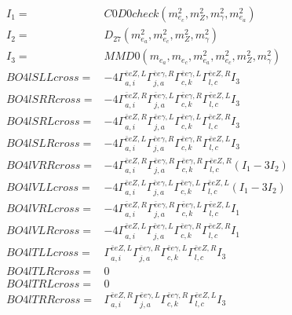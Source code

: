 \documentclass[A4,landscape]{article}
\begin{document}
\begin{align} 
I_1 = & C0D0check(m^2_{e_{{c}}}, m^2_{Z}, m^2_{\gamma}, m^2_{e_{{a}}}) \\ 
I_2 = & D_{27}(m^2_{e_{{a}}}, m^2_{e_{{c}}}, m^2_{Z}, m^2_{\gamma}) \\ 
I_3 = & MMD0(m_{e_{{a}}}, m_{e_{{c}}}, m^2_{e_{{a}}}, m^2_{e_{{c}}}, m^2_{Z}, m^2_{\gamma}) \\ 
  BO4lSLLcross= & -4  \Gamma^{\bar{e}e Z ,L}_{a, i} \Gamma^{\bar{e}e \gamma ,R}_{j, a} \Gamma^{\bar{e}e \gamma ,L}_{c, k} \Gamma^{\bar{e}e Z ,R}_{l, c} I_3 \\ 
  BO4lSRRcross= & -4  \Gamma^{\bar{e}e Z ,R}_{a, i} \Gamma^{\bar{e}e \gamma ,L}_{j, a} \Gamma^{\bar{e}e \gamma ,R}_{c, k} \Gamma^{\bar{e}e Z ,L}_{l, c} I_3 \\ 
  BO4lSRLcross= & -4  \Gamma^{\bar{e}e Z ,R}_{a, i} \Gamma^{\bar{e}e \gamma ,L}_{j, a} \Gamma^{\bar{e}e \gamma ,L}_{c, k} \Gamma^{\bar{e}e Z ,R}_{l, c} I_3 \\ 
  BO4lSLRcross= & -4  \Gamma^{\bar{e}e Z ,L}_{a, i} \Gamma^{\bar{e}e \gamma ,R}_{j, a} \Gamma^{\bar{e}e \gamma ,R}_{c, k} \Gamma^{\bar{e}e Z ,L}_{l, c} I_3 \\ 
  BO4lVRRcross= & -4  \Gamma^{\bar{e}e Z ,R}_{a, i} \Gamma^{\bar{e}e \gamma ,R}_{j, a} \Gamma^{\bar{e}e \gamma ,R}_{c, k} \Gamma^{\bar{e}e Z ,R}_{l, c} (I_1 - 3 I_2) \\ 
  BO4lVLLcross= & -4  \Gamma^{\bar{e}e Z ,L}_{a, i} \Gamma^{\bar{e}e \gamma ,L}_{j, a} \Gamma^{\bar{e}e \gamma ,L}_{c, k} \Gamma^{\bar{e}e Z ,L}_{l, c} (I_1 - 3 I_2) \\ 
  BO4lVRLcross= & -4  \Gamma^{\bar{e}e Z ,R}_{a, i} \Gamma^{\bar{e}e \gamma ,R}_{j, a} \Gamma^{\bar{e}e \gamma ,L}_{c, k} \Gamma^{\bar{e}e Z ,L}_{l, c} I_1 \\ 
  BO4lVLRcross= & -4  \Gamma^{\bar{e}e Z ,L}_{a, i} \Gamma^{\bar{e}e \gamma ,L}_{j, a} \Gamma^{\bar{e}e \gamma ,R}_{c, k} \Gamma^{\bar{e}e Z ,R}_{l, c} I_1 \\ 
  BO4lTLLcross= &  \Gamma^{\bar{e}e Z ,L}_{a, i} \Gamma^{\bar{e}e \gamma ,R}_{j, a} \Gamma^{\bar{e}e \gamma ,L}_{c, k} \Gamma^{\bar{e}e Z ,R}_{l, c} I_3 \\ 
  BO4lTLRcross= & 0 \\ 
  BO4lTRLcross= & 0 \\ 
  BO4lTRRcross= &  \Gamma^{\bar{e}e Z ,R}_{a, i} \Gamma^{\bar{e}e \gamma ,L}_{j, a} \Gamma^{\bar{e}e \gamma ,R}_{c, k} \Gamma^{\bar{e}e Z ,L}_{l, c} I_3 \\ 
\end{align} 
\end{document}
